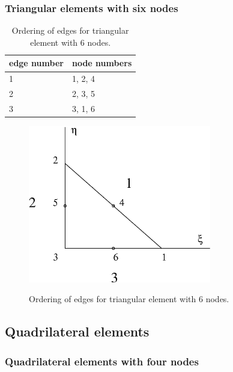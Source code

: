 \subsubsection{Triangular elements with six nodes}

\begin{table}[h]
\begin{center}
\begin{tabular}{|l|l|}
\hline
edge number & node numbers
\\ \hline
1 & 1, 2, 4
\\ \hline
2 & 2, 3, 5
\\ \hline
3 & 3, 1, 6
\\ \hline
\end{tabular}
\label{tabquadtriangedges}
\caption{Ordering of edges for triangular element with 6 nodes.}
\end{center}
\end{table}

\begin{figure}[h]
\begin{center}
\includegraphics[width=80mm]{FIG/quadtriangedges.eps}
\label{figquadtriangedges}
\caption{Ordering of edges for triangular element with 6 nodes.}
\end{center}
\end{figure}

\subsection{Quadrilateral elements}

\subsubsection{Quadrilateral elements with four nodes}

